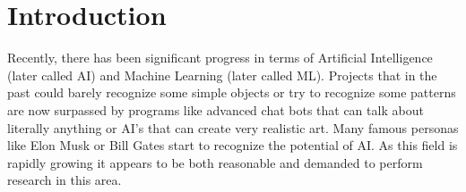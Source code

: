 \chapter{Introduction}

    Recently, there has been significant progress in terms of Artificial Intelligence (later called AI) and Machine Learning (later called ML). Projects that in the past could barely recognize some simple objects or try to recognize some patterns are now surpassed by programs like advanced chat bots that can talk about literally anything or AI’s that can create very realistic art. Many famous personas like Elon Musk or Bill Gates start to recognize the potential of AI. 
    As this field is rapidly growing it appears to be both reasonable and demanded to perform research in this area.